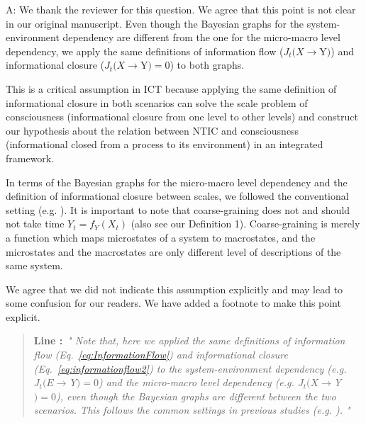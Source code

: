 \documentclass[utf8]{article}
\newenvironment{ans}  
    {\color{Black}\noindent A:}
    {~\newline}
\newcommand{\addnew}[2]{\blockcquote{}{\textbf{Line #1:}~\newline\textit{"#2"}}
}
\begin{document}
    	\begin{ans}
    		We thank the reviewer for this question. We agree that this point is not clear in our original manuscript. Even though the Bayesian graphs for the system-environment dependency are different from the one for the micro-macro level dependency, we apply the same definitions of information flow ($J_{t}(X \rightarrow $Y$ )$) and informational closure ($J_{t}(X \rightarrow $Y$ )=0$) to both graphs. 
    		
    		This is a critical assumption in ICT because applying the same definition of informational closure in both scenarios can solve the scale problem of consciousness (informational closure from one level to other levels) and construct our hypothesis about the relation between NTIC and consciousness (informational closed from a process to its environment) in an integrated framework.
    		
    		In terms of the Bayesian graphs for the micro-macro level dependency and the definition of informational closure between scales, we followed the conventional setting (e.g. \cite{PFANTE.2014}). It is important to note that coarse-graining does not and should not take time $Y_t=f_Y(X_t)$ (also see our Definition 1). Coarse-graining is merely a function which maps microstates of a system to macrostates, and the microstates and the macrostates are only different level of descriptions of the same system.
    		
    		We agree that we did not indicate this assumption explicitly and may lead to some confusion for our readers. We have added a footnote to make this point explicit. 
    		
    		\addnew{}{
    			Note that, here we applied the same definitions of information flow (Eq.~\ref{eq:InformationFlow}) and informational closure (Eq.~\ref{eq:informationflow2}) to the system-environment dependency (e.g. $J_{t}(E \rightarrow $Y$ )=0$) and the micro-macro level dependency (e.g. $J_{t}(X \rightarrow $Y$ )=0$), even though the Bayesian graphs are different between the two scenarios. This follows the common settings in previous studies (e.g. \cite{BERTSCHINGER.2006, PFANTE.2014}).
    		}	
    		
    		
    		

\end{ans}
\end{document}

